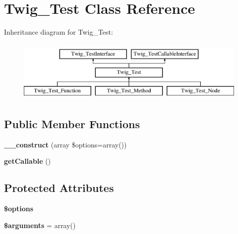 \hypertarget{classTwig__Test}{}\section{Twig\+\_\+\+Test Class Reference}
\label{classTwig__Test}
Inheritance diagram for Twig\+\_\+\+Test\+:\begin{figure}[H]
\begin{center}
\leavevmode
\includegraphics[height=3.000000cm]{classTwig__Test}
\end{center}
\end{figure}
\subsection*{Public Member Functions}
\begin{DoxyCompactItemize}
\item 
{\bfseries \+\_\+\+\_\+construct} (array \$options=array())\hypertarget{classTwig__Test_a0bf73d3c126b551697ea9ead44191408}{}\label{classTwig__Test_a0bf73d3c126b551697ea9ead44191408}

\item 
{\bfseries get\+Callable} ()\hypertarget{classTwig__Test_a56ffd6ea1e3c0d650b9a2828e47c6d1d}{}\label{classTwig__Test_a56ffd6ea1e3c0d650b9a2828e47c6d1d}

\end{DoxyCompactItemize}
\subsection*{Protected Attributes}
\begin{DoxyCompactItemize}
\item 
{\bfseries \$options}\hypertarget{classTwig__Test_a0d7d038253e2d65fe9fa9ee95a783518}{}\label{classTwig__Test_a0d7d038253e2d65fe9fa9ee95a783518}

\item 
{\bfseries \$arguments} = array()\hypertarget{classTwig__Test_a6b0321a6e2e7c4b6c81ea42c9d2671c4}{}\label{classTwig__Test_a6b0321a6e2e7c4b6c81ea42c9d2671c4}

\end{DoxyCompactItemize}


